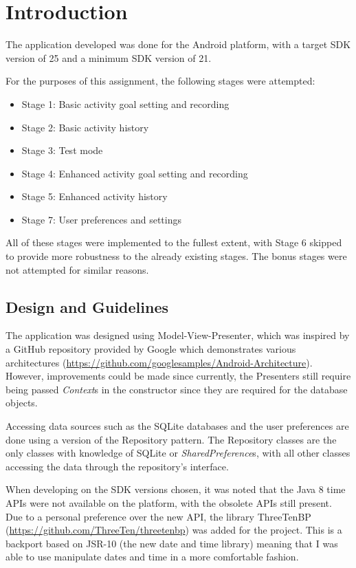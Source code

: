 \documentclass[report.tex]{subfiles}
\begin{document}
\section{Introduction} %
\label{sec:introduction}
The application developed was done for the Android platform, with a target SDK
version of 25 and a minimum SDK version of 21.

For the purposes of this assignment, the following stages were attempted:
\begin{itemize}
    \item Stage 1: Basic activity goal setting and recording
    \item Stage 2: Basic activity history
    \item Stage 3: Test mode
    \item Stage 4: Enhanced activity goal setting and recording
    \item Stage 5: Enhanced activity history
    \item Stage 7: User preferences and settings
\end{itemize}

All of these stages were implemented to the fullest extent, with Stage 6 skipped
to provide more robustness to the already existing stages. The bonus stages were
not attempted for similar reasons.

\subsection{Design and Guidelines} %
\label{sub:design_and_guidelines}
The application was designed using Model-View-Presenter, which was inspired by
a GitHub repository provided by Google which demonstrates various architectures
(\url{https://github.com/googlesamples/Android-Architecture}). However,
improvements could be made since currently, the Presenters still require being
passed \emph{Context}s in the constructor since they are required for the
database objects.

Accessing data sources such as the SQLite databases and the user preferences
are done using a version of the Repository pattern. The Repository classes are
the only classes with knowledge of SQLite or \emph{SharedPreference}s, with
all other classes accessing the data through the repository's interface.

When developing on the SDK versions chosen, it was noted that the Java 8 time
APIs were not available on the platform, with the obsolete APIs still present.
Due to a personal preference over the new API, the library ThreeTenBP
(\url{https://github.com/ThreeTen/threetenbp}) was added for the project. This
is a backport based on JSR-10 (the new date and time library) meaning that I
was able to use manipulate dates and time in a more comfortable fashion.
\end{document}
